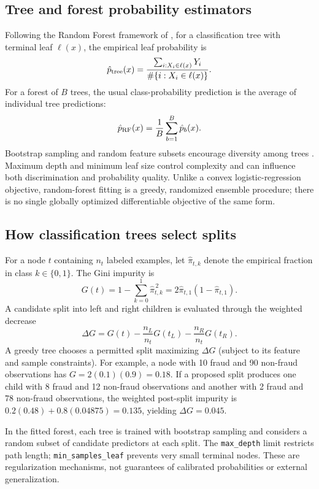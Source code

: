 \documentclass[11pt,a4paper]{article}
\begin{document}
\subsection{Tree and forest probability estimators}
Following the Random Forest framework of \cite{breiman2001}, for a classification tree with terminal leaf $\ell(x)$, the empirical leaf probability is
\begin{equation}\hat p_{\rm tree}(x)=\frac{\sum_{i:X_i\in\ell(x)}Y_i}{\#\{i:X_i\in\ell(x)\}}.\end{equation}
For a forest of $B$ trees, the usual class-probability prediction is the average of individual tree predictions:
\begin{equation}\hat p_{\rm RF}(x)=\frac1B\sum_{b=1}^B\hat p_b(x).\end{equation}
Bootstrap sampling and random feature subsets encourage diversity among trees \cite{breiman2001}. Maximum depth and minimum leaf size control complexity and can influence both discrimination and probability quality. Unlike a convex logistic-regression objective, random-forest fitting is a greedy, randomized ensemble procedure; there is no single globally optimized differentiable objective of the same form.
\subsection{How classification trees select splits}
For a node $t$ containing $n_t$ labeled examples, let $\hat\pi_{t,k}$ denote the empirical fraction in class $k\in\{0,1\}$. The Gini impurity is
\begin{equation}G(t)=1-\sum_{k=0}^{1}\hat\pi_{t,k}^{\,2}=2\hat\pi_{t,1}(1-\hat\pi_{t,1}).\end{equation}
A candidate split into left and right children is evaluated through the weighted decrease
\begin{equation}\Delta G=G(t)-\frac{n_L}{n_t}G(t_L)-\frac{n_R}{n_t}G(t_R).\end{equation}
A greedy tree chooses a permitted split maximizing $\Delta G$ (subject to its feature and sample constraints). For example, a node with 10 fraud and 90 non-fraud observations has $G=2(0.1)(0.9)=0.18$. If a proposed split produces one child with 8 fraud and 12 non-fraud observations and another with 2 fraud and 78 non-fraud observations, the weighted post-split impurity is $0.2(0.48)+0.8(0.04875)=0.135$, yielding $\Delta G=0.045$.

In the fitted forest, each tree is trained with bootstrap sampling and considers a random subset of candidate predictors at each split. The \texttt{max\_depth} limit restricts path length; \texttt{min\_samples\_leaf} prevents very small terminal nodes. These are regularization mechanisms, not guarantees of calibrated probabilities or external generalization.
\end{document}
